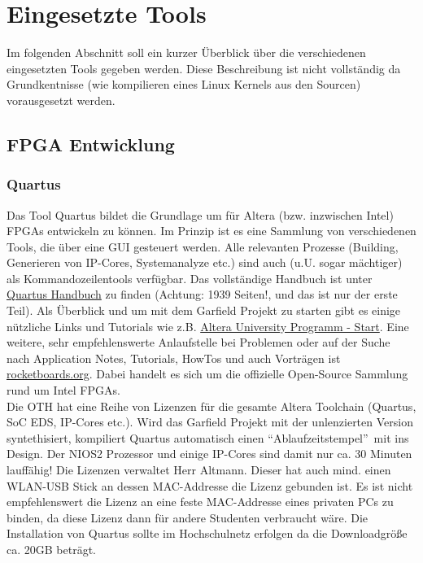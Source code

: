 \section{Eingesetzte Tools}
Im folgenden Abschnitt soll ein kurzer Überblick über die verschiedenen eingesetzten Tools gegeben werden. Diese Beschreibung ist nicht vollständig da Grundkentnisse (wie kompilieren eines Linux Kernels aus den Sourcen) vorausgesetzt werden.

\subsection{\ac{FPGA} Entwicklung}

\subsubsection{Quartus}
Das Tool Quartus bildet die Grundlage um für Altera (bzw. inzwischen Intel) \acp{FPGA} entwickeln zu können. Im Prinzip ist es eine Sammlung von verschiedenen Tools, die über eine GUI gesteuert werden. Alle relevanten Prozesse (Building, Generieren von IP-Cores, Systemanalyze etc.) sind auch (u.U. sogar mächtiger) als Kommandozeilentools verfügbar. Das vollständige Handbuch ist unter \href{https://www.altera.com/en_US/pdfs/literature/hb/qts/qts-qps-handbook.pdf}{Quartus Handbuch} zu finden (Achtung: 1939 Seiten!, und das ist nur der erste Teil). Als Überblick und um mit dem Garfield Projekt zu starten gibt es einige nützliche Links und Tutorials wie z.B. \href{https://www.altera.com/support/training/university/materials-tutorials.html}{Altera University Programm - Start}. Eine weitere, sehr empfehlenswerte Anlaufstelle bei Problemen oder auf der Suche nach Application Notes, Tutorials, HowTos und auch Vorträgen ist \href{rocketboards.org}{rocketboards.org}. Dabei handelt es sich um die offizielle Open-Source Sammlung rund um Intel \acp{FPGA}.\\

Die OTH hat eine Reihe von Lizenzen für die gesamte Altera Toolchain (Quartus, SoC EDS, IP-Cores etc.). Wird das Garfield Projekt mit der unlenzierten Version syntethisiert, kompiliert Quartus automatisch einen \textquotedblleft Ablaufzeitstempel\textquotedblright~mit ins Design. Der NIOS2 Prozessor und einige \ac{IP}-Cores sind damit nur ca. 30 Minuten lauffähig! Die Lizenzen verwaltet Herr Altmann. Dieser hat auch mind. einen WLAN-USB Stick an dessen MAC-Addresse die Lizenz gebunden ist. Es ist nicht empfehlenswert die Lizenz an eine feste MAC-Addresse eines privaten PCs zu binden, da diese Lizenz dann für andere Studenten verbraucht wäre. Die Installation von Quartus sollte im Hochschulnetz erfolgen da die Downloadgröße ca. 20GB beträgt.

